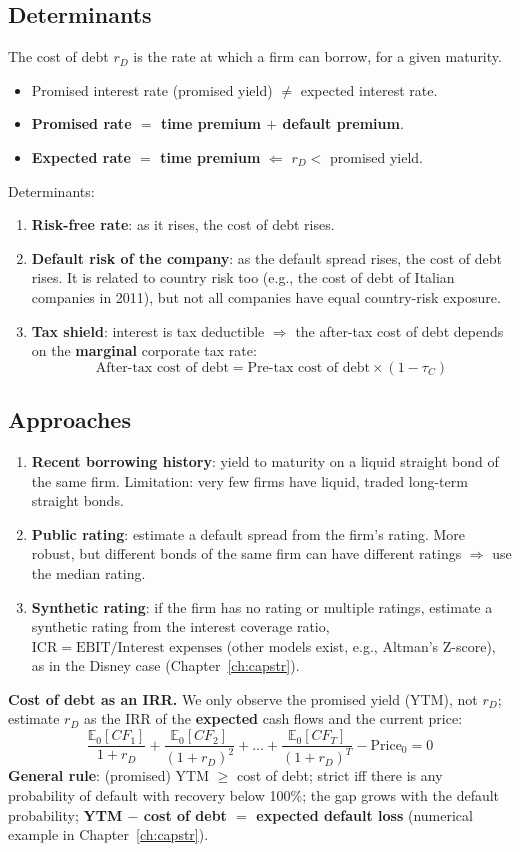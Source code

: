 \subsection{Determinants}
The cost of debt $r_D$ is the rate at which a firm can borrow, for a given maturity.
\begin{itemize}
  \item Promised interest rate (promised yield) $\neq$ expected interest rate.
  \item \textbf{Promised rate $=$ time premium $+$ default premium}.
  \item \textbf{Expected rate $=$ time premium} $\Leftarrow$ $r_D<$ promised yield.
\end{itemize}
Determinants:
\begin{enumerate}
  \item \textbf{Risk-free rate}: as it rises, the cost of debt rises.
  \item \textbf{Default risk of the company}: as the default spread rises, the cost of debt rises. It is related to country risk too (e.g., the cost of debt of Italian companies in 2011), but not all companies have equal country-risk exposure.
  \item \textbf{Tax shield}: interest is tax deductible $\Rightarrow$ the after-tax cost of debt depends on the \textbf{marginal} corporate tax rate:
  \[
  \text{After-tax cost of debt}=\text{Pre-tax cost of debt}\times(1-\tau_C)
  \]
\end{enumerate}

\subsection{Approaches}
\begin{enumerate}
  \item \textbf{Recent borrowing history}: yield to maturity on a liquid straight bond of the same firm. Limitation: very few firms have liquid, traded long-term straight bonds.
  \item \textbf{Public rating}: estimate a default spread from the firm's rating. More robust, but different bonds of the same firm can have different ratings $\Rightarrow$ use the median rating.
  \item \textbf{Synthetic rating}: if the firm has no rating or multiple ratings, estimate a synthetic rating from the interest coverage ratio, $\text{ICR}=\text{EBIT}/\text{Interest expenses}$ (other models exist, e.g., Altman's Z-score), as in the Disney case (Chapter~\ref{ch:capstr}).
\end{enumerate}
\textbf{Cost of debt as an IRR.} We only observe the promised yield (YTM), not $r_D$; estimate $r_D$ as the IRR of the \textbf{expected} cash flows and the current price:
\[
\frac{\mathbb{E}_0[CF_1]}{1+r_D}+\frac{\mathbb{E}_0[CF_2]}{(1+r_D)^2}+\dots+\frac{\mathbb{E}_0[CF_T]}{(1+r_D)^T}-\text{Price}_0=0
\]
\textbf{General rule}: (promised) YTM $\geq$ cost of debt; strict iff there is any probability of default with recovery below 100\%; the gap grows with the default probability; \textbf{YTM $-$ cost of debt $=$ expected default loss} (numerical example in Chapter~\ref{ch:capstr}).

